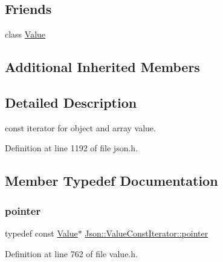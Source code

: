 \subsection*{Friends}
\begin{DoxyCompactItemize}
\item 
class \hyperlink{class_json_1_1_value_const_iterator_a896c037a32087c5c20d97e64a1786880}{Value}
\end{DoxyCompactItemize}
\subsection*{Additional Inherited Members}


\subsection{Detailed Description}
const iterator for object and array value. 



Definition at line 1192 of file json.\+h.



\subsection{Member Typedef Documentation}
\hypertarget{class_json_1_1_value_const_iterator_a400136bd8bc09e9fddec0785fa2cff14}{}\label{class_json_1_1_value_const_iterator_a400136bd8bc09e9fddec0785fa2cff14} 
\subsubsection{\texorpdfstring{pointer}{pointer}\hspace{0.1cm}{\footnotesize\ttfamily [1/2]}}
{\footnotesize\ttfamily typedef const \hyperlink{class_json_1_1_value}{Value}$\ast$ \hyperlink{class_json_1_1_value_const_iterator_a400136bd8bc09e9fddec0785fa2cff14}{Json\+::\+Value\+Const\+Iterator\+::pointer}}



Definition at line 762 of file value.\+h.

\hypertarget{class_json_1_1_value_const_iterator_a400136bd8bc09e9fddec0785fa2cff14}{}\label{class_json_1_1_value_const_iterator_a400136bd8bc09e9fddec0785fa2cff14} 
